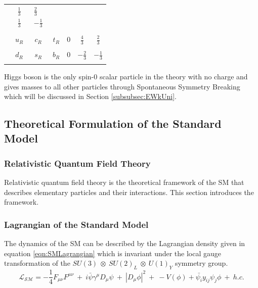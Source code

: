 \begin{table}
\begin{center}
\begin{tabular}{| c | c | c | c | c | c | c |}
					&$\begin{matrix} \frac{1}{3} \\[0.15cm] \frac{1}{3} \end{matrix}$
					&$\begin{matrix} \frac{2}{3} \\[0.15cm] -\frac{1}{3} \end{matrix}$\\
				& & & & & & \\
					& $u_{R}$ & $c_{R}$ &  $t_{R}$ & $0$ & $\frac{4}{3}$  & $\frac{2}{3}$ \\
					& & & & & & \\
					& $d_{R}$ & $s_{R}$ &  $b_{R}$ & $0$ & $-\frac{2}{3}$  & $-\frac{1}{3}$ \\
& & & & & & \\
\hline
\end{tabular}
\label{tab:Fermions}
\end{center}
\end{table}

Higgs boson is the only spin-0 scalar particle in the theory with no charge and gives masses to all other particles through Spontaneous Symmetry Breaking which will be discussed in Section \ref{subsubsec:EWkUni}.

\subsection{Theoretical Formulation of the Standard Model}
\label{subsec:TheoryFormulation}

\subsubsection{Relativistic Quantum Field Theory}
\label{subsubsec:RelQFT}
Relativistic quantum field theory is the theoretical framework of the SM that describes elementary particles and their interactions. This section introduces the framework. 

\subsubsection{Lagrangian of the Standard Model}
\label{subsubsec:SMLag}
The dynamics of the SM can be described by the Lagrangian density given in equation \ref{eqn:SMLagrangian} which is invariant under the local gauge transformation of the $SU(3)~\otimes~SU(2)_{L}~\otimes~U(1)_{Y}$ symmetry group. 
\begin{equation}
\mathcal{L_{SM}} = -\frac{1}{4}F_{\mu\nu}F^{\mu\nu} ~+~ i\bar{\psi}\gamma^{\mu}D_{\mu}\psi ~+~ |D_{\mu}\phi|^{2} ~+~ -V(\phi) + \bar{\psi_{i}}y_{ij}\psi_{j}\phi ~+~ h.c.
\label{eqn:SMLagrangian}
\end{equation}

